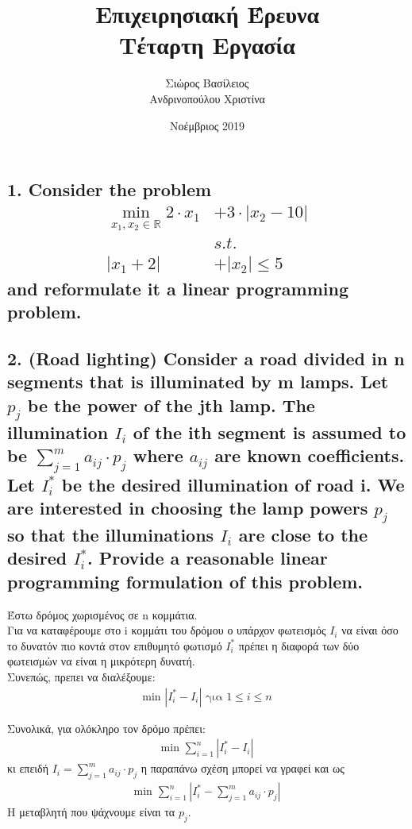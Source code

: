 \documentclass[12pt]{article}
\title{\hugeΑλγοριθμική Επιχειρησιακή Έρευνα\\Τέταρτη Εργασία}
\author{Σιώρος Βασίλειος\\Ανδρινοπούλου Χριστίνα}
\date{Νοέμβριος 2019}
\newcommand{\R}{\mathbb{R}}
\newcommand{\centered}[1]{\begin{align*}#1\end{align*}}
\newcommand{\abs}[1]{\left\lvert#1\right\rvert}
\begin{document}
\maketitle


\pagebreak


\subsection*{1. Consider the problem
\begin{align*}
    \min_{x_1, x_2 \in \R} 2 \cdot x_1 & + 3 \cdot \abs{x_2 - 10} \\
    &s.t. \\
    \abs{x_1 + 2} & + \abs{x_2} \leq 5
\end{align*}
and reformulate it a linear programming problem.}

\vspace{2in}

\pagebreak

\subsection*{2. (Road lighting) Consider a road divided in n segments that is illuminated by m
	lamps. Let \(p_{j}\) be the power of the jth lamp. The illumination \(I_{i}\) of the ith segment is assumed
	to be \(\sum_{j=1}^{m}{a_{ij} \cdot p_{j}}\)
	where \(a_{ij}\) are known coefficients. Let \(I_{i}^{*}\) be the desired illumination of road i.
	We are interested in choosing the lamp powers \(p_{j}\) so that the illuminations \(I_{i}\) are close to the
	desired \(I_{i}^{*}\). Provide a reasonable linear programming formulation of this problem.}

Έστω δρόμος χωρισμένος σε n κομμάτια. \\

Για να καταφέρουμε στο i κομμάτι του δρόμου ο υπάρχον φωτεισμός \(I_{i}\) να είναι όσο το δυνατόν πιο κοντά στον επιθυμητό φωτισμό \(I_{i}^{*}\) πρέπει η διαφορά των δύο φωτεισμών να είναι η μικρότερη δυνατή. \\

Συνεπώς, πρεπει να διαλέξουμε:
\centered{\mbox{min }\abs{ I_{i}^{*} - I_{i} } \mbox{ για } 1 \leq i \leq n}

Συνολικά, για ολόκληρο τον δρόμο πρέπει: \\
\centered{\mbox{min } \sum_{i=1}^{n}{\abs{ I_{i}^{*} - I_{i} }} }
κι επειδή \(I_{i} = \sum_{j=1}^{m}{a_{ij} \cdot p_{j}}\) η παραπάνω σχέση μπορεί να γραφεί και ως \\
\centered{\mbox{min } \sum_{i=1}^{n}{\abs{ I_{i}^{*} - \sum_{j=1}^{m}{a_{ij} \cdot p_{j}} }} }
Η μεταβλητή που ψάχνουμε είναι τα \(p_{j}\). \\
\end{document}
